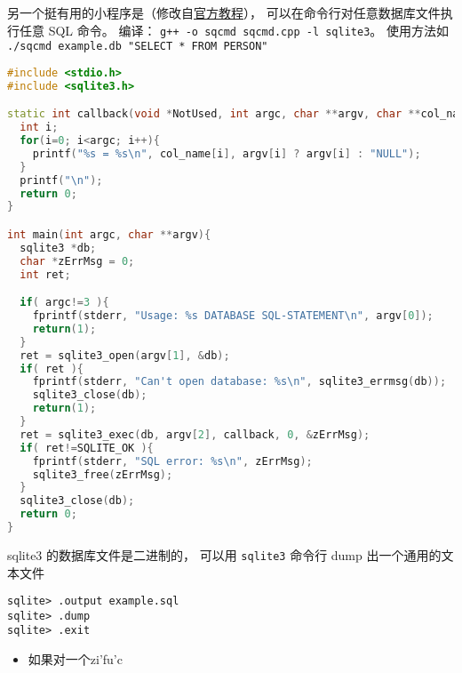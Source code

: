 另一个挺有用的小程序是（修改自\href{https://www.sqlite.org/quickstart.html}{官方教程}）， 可以在命令行对任意数据库文件执行任意 SQL 命令。 编译： \verb|g++ -o sqcmd sqcmd.cpp -l sqlite3|。 使用方法如 \verb|./sqcmd example.db "SELECT * FROM PERSON"|
\begin{lstlisting}[language=cpp]
#include <stdio.h>
#include <sqlite3.h>

static int callback(void *NotUsed, int argc, char **argv, char **col_name){
  int i;
  for(i=0; i<argc; i++){
    printf("%s = %s\n", col_name[i], argv[i] ? argv[i] : "NULL");
  }
  printf("\n");
  return 0;
}

int main(int argc, char **argv){
  sqlite3 *db;
  char *zErrMsg = 0;
  int ret;

  if( argc!=3 ){
    fprintf(stderr, "Usage: %s DATABASE SQL-STATEMENT\n", argv[0]);
    return(1);
  }
  ret = sqlite3_open(argv[1], &db);
  if( ret ){
    fprintf(stderr, "Can't open database: %s\n", sqlite3_errmsg(db));
    sqlite3_close(db);
    return(1);
  }
  ret = sqlite3_exec(db, argv[2], callback, 0, &zErrMsg);
  if( ret!=SQLITE_OK ){
    fprintf(stderr, "SQL error: %s\n", zErrMsg);
    sqlite3_free(zErrMsg);
  }
  sqlite3_close(db);
  return 0;
}
\end{lstlisting}

sqlite3 的数据库文件是二进制的， 可以用 \verb|sqlite3| 命令行 dump 出一个通用的文本文件
\begin{lstlisting}[language=none]
sqlite> .output example.sql
sqlite> .dump
sqlite> .exit
\end{lstlisting}

\begin{itemize}
\item 如果对一个zi'fu'c
\end{itemize}



